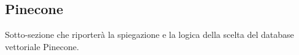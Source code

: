 \subsection{Pinecone}

Sotto-sezione che riporterà la spiegazione e la logica della scelta del database vettoriale Pinecone.